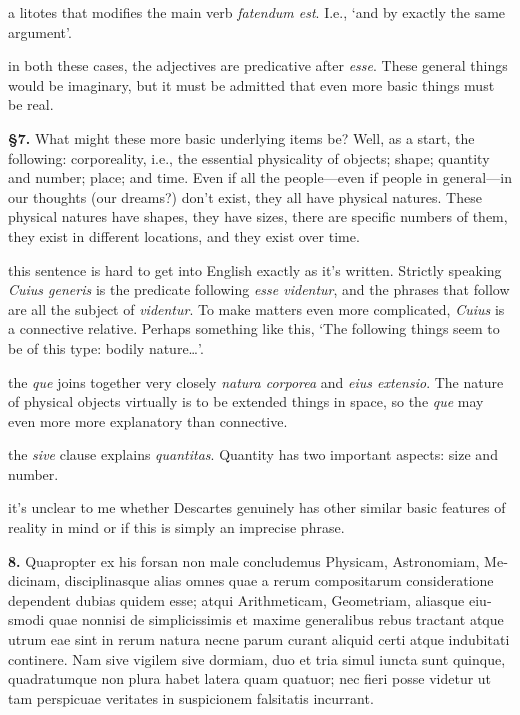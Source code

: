  a litotes that modifies the main verb \textit{fatendum est}. I.e., `and by exactly the same argument'.

 in both these cases, the adjectives are predicative after \textit{esse}. These general things would be imaginary, but it must be admitted that even more basic things must be real.

\textbf{§7.} What might these more basic underlying items be? Well, as a start, the following: corporeality, i.e., the essential physicality of objects; shape; quantity and number; place; and time. Even if all the people---even if people in general---in our thoughts (our dreams?) don't exist, they all have physical natures. These physical natures have shapes, they have sizes, there are specific numbers of them, they exist in different locations, and they exist over time.

 this sentence is hard to get into English exactly as it's written. Strictly speaking \textit{Cuius generis} is the predicate following \textit{esse videntur}, and the phrases that follow are all the subject of \textit{videntur}. To make matters even more complicated, \textit{Cuius} is a connective relative. Perhaps something like this, `The following things seem to be of this type: bodily nature\dots'.

 the \textit{que} joins together very closely \textit{natura corporea} and \textit{eius extensio}. The nature of physical objects virtually is to be extended things in space, so the \textit{que} may even more more explanatory than connective.

 the \textit{sive} clause explains \textit{quantitas}. Quantity has two important aspects: size and number.

 it's unclear to me whether Descartes genuinely has other similar basic features of reality in mind or if this is simply an imprecise phrase.

\clearpage

\beginnumbering
\pstart
\begin{latin}
    \textenglish{\textbf{8.}} Quapropter ex his forsan non male concludemus Physicam, Astronomiam, Medicinam, disciplinasque alias omnes quae a rerum compositarum consideratione dependent dubias quidem esse; atqui Arithmeticam, Geometriam, aliasque eiusmodi quae nonnisi de simplicissimis et maxime generalibus rebus tractant atque utrum eae sint in rerum natura necne parum curant aliquid certi atque indubitati continere. Nam sive vigilem sive dormiam, duo et tria simul iuncta sunt quinque, quadratumque non plura habet latera quam quatuor; nec fieri posse videtur ut tam perspicuae veritates in suspicionem falsitatis incurrant.
\end{latin}
\pend
\endnumbering

